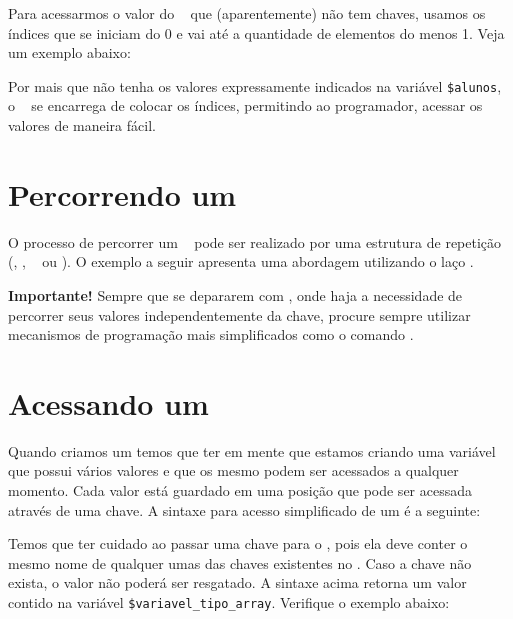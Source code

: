 Para acessarmos o valor do \tipoarray~ que (aparentemente) não tem chaves, usamos
os índices que se iniciam do 0 e vai até a quantidade de elementos do \tipoarray menos 1.
Veja um exemplo abaixo:



Por mais que não tenha os valores expressamente indicados na variável \texttt{\$alunos},
o \php~ se encarrega de colocar os índices, permitindo ao programador, acessar os valores
de maneira fácil.

\section{Percorrendo um \tipoarray}
\label{percorrendo-um-array}

O processo de percorrer um \tipoarray~ pode ser realizado por uma estrutura de 
repetição (\comandofor, \comandowhile, \comandodowhile~ ou \comandoforeach). O exemplo a 
seguir apresenta uma abordagem utilizando o laço \comandoforeach.



\begin{framed}
\textbf{{\Large Importante!}}
Sempre que se depararem com \tipoarrays, onde haja a necessidade de percorrer 
seus valores independentemente da chave, procure sempre utilizar mecanismos de 
programação mais simplificados como o comando \comandoforeach.
\end{framed}

\section{Acessando um \tipoarray}
\label{acessando-um-array}

Quando criamos um \tipoarray temos que ter em mente que estamos criando uma variável 
que possui vários valores e que os mesmo podem ser acessados a qualquer momento. 
Cada valor está guardado em uma posição que pode ser acessada através de uma chave.
A sintaxe para acesso simplificado de um \tipoarray é a seguinte:


Temos que ter cuidado ao passar uma chave para o \tipoarray, pois ela deve conter o 
mesmo nome de qualquer umas das chaves existentes no \tipoarray. Caso a chave não exista, 
o valor não poderá ser resgatado. A sintaxe acima retorna um valor contido na variável 
\texttt{\$variavel\_tipo\_array}. Verifique o exemplo abaixo: 


